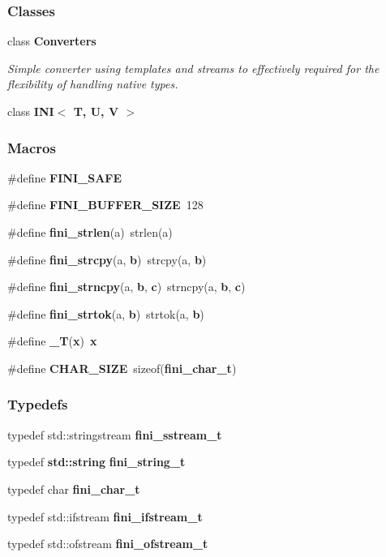 \subsubsection*{Classes}
\begin{DoxyCompactItemize}
\item 
class {\bf Converters}
\begin{DoxyCompactList}\small\item\em Simple converter using templates and streams to effectively required for the flexibility of handling native types. \end{DoxyCompactList}\item 
class {\bf I\+N\+I$<$ T, U, V $>$}
\end{DoxyCompactItemize}
\subsubsection*{Macros}
\begin{DoxyCompactItemize}
\item 
\#define {\bf F\+I\+N\+I\+\_\+\+S\+A\+FE}
\item 
\#define {\bf F\+I\+N\+I\+\_\+\+B\+U\+F\+F\+E\+R\+\_\+\+S\+I\+ZE}~128
\item 
\#define {\bf fini\+\_\+strlen}(a)~strlen(a)
\item 
\#define {\bf fini\+\_\+strcpy}(a,  {\bf b})~strcpy(a, {\bf b})
\item 
\#define {\bf fini\+\_\+strncpy}(a,  {\bf b},  {\bf c})~strncpy(a, {\bf b}, {\bf c})
\item 
\#define {\bf fini\+\_\+strtok}(a,  {\bf b})~strtok(a, {\bf b})
\item 
\#define {\bf \+\_\+T}({\bf x})~{\bf x}
\item 
\#define {\bf C\+H\+A\+R\+\_\+\+S\+I\+ZE}~sizeof({\bf fini\+\_\+char\+\_\+t})
\end{DoxyCompactItemize}
\subsubsection*{Typedefs}
\begin{DoxyCompactItemize}
\item 
typedef std\+::stringstream {\bf fini\+\_\+sstream\+\_\+t}
\item 
typedef {\bf std\+::string} {\bf fini\+\_\+string\+\_\+t}
\item 
typedef char {\bf fini\+\_\+char\+\_\+t}
\item 
typedef std\+::ifstream {\bf fini\+\_\+ifstream\+\_\+t}
\item 
typedef std\+::ofstream {\bf fini\+\_\+ofstream\+\_\+t}
\end{DoxyCompactItemize}



